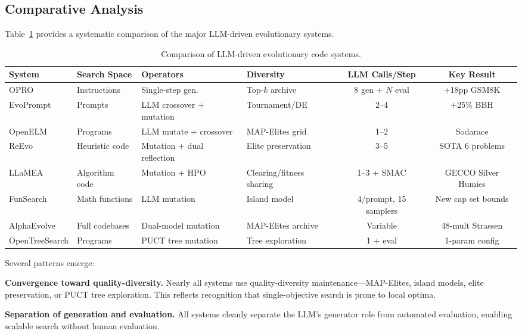 \subsection{Comparative Analysis}
\label{sec:evo-comparison}

Table~\ref{tab:evo-comparison} provides a systematic comparison of the major LLM-driven evolutionary systems.

\begin{table}[t]
\centering
\caption{Comparison of LLM-driven evolutionary code systems.}
\label{tab:evo-comparison}
\small
\begin{tabular}{@{}llllcc@{}}
\toprule
\textbf{System} & \textbf{Search Space} & \textbf{Operators} & \textbf{Diversity} & \textbf{LLM Calls/Step} & \textbf{Key Result} \\
\midrule
OPRO & Instructions & Single-step gen. & Top-$k$ archive & 8 gen + $N$ eval & +18pp GSM8K \\
EvoPrompt & Prompts & LLM crossover + mutation & Tournament/DE & 2--4 & +25\% BBH \\
OpenELM & Programs & LLM mutate + crossover & MAP-Elites grid & 1--2 & Sodarace \\
ReEvo & Heuristic code & Mutation + dual reflection & Elite preservation & 3--5 & SOTA 6 problems \\
LLaMEA & Algorithm code & Mutation + HPO & Clearing/fitness sharing & 1--3 + SMAC & GECCO Silver Humies \\
FunSearch & Math functions & LLM mutation & Island model & 4/prompt, 15 samplers & New cap set bounds \\
AlphaEvolve & Full codebases & Dual-model mutation & MAP-Elites archive & Variable & 48-mult Strassen \\
OpenTreeSearch & Programs & PUCT tree mutation & Tree exploration & 1 + eval & 1-param config \\
\bottomrule
\end{tabular}
\end{table}

Several patterns emerge:

\textbf{Convergence toward quality-diversity.} Nearly all systems use quality-diversity maintenance---MAP-Elites, island models, elite preservation, or PUCT tree exploration. This reflects recognition that single-objective search is prone to local optima.

\textbf{Separation of generation and evaluation.} All systems cleanly separate the LLM's generator role from automated evaluation, enabling scalable search without human evaluation.

